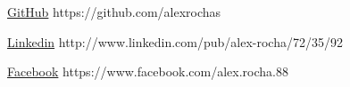 \documentclass{tccv}
\begin{document}
\begin{factlist}

\item{\href{https://github.com/alexrochas}{GitHub}}
    {https://github.com/alexrochas}

\item{\href{http://www.linkedin.com/pub/alex-rocha/72/35/92}{Linkedin}}
    {http://www.linkedin.com/pub/\linebreak[1]alex-rocha/72/35/92}

\item{\href{https://www.facebook.com/alex.rocha.88}{Facebook}}
{https://www.facebook.com/\linebreak[1]alex.rocha.88}

\end{factlist}
\end{document}
